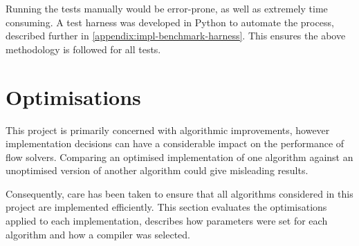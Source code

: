 Running the tests manually would be error-prone, as well as extremely time consuming. A test harness was developed in Python to automate the process, described further in \cref{appendix:impl-benchmark-harness}. This ensures the above methodology is followed for all tests.



\section{Optimisations} \label{sec:eval-optimisations}

This project is primarily concerned with algorithmic improvements, however implementation decisions can have a considerable impact on the performance of flow solvers. Comparing an optimised implementation of one algorithm against an unoptimised version of another algorithm could give misleading results. 

Consequently, care has been taken to ensure that all algorithms considered in this project are implemented efficiently. This section evaluates the optimisations applied to each implementation, describes how parameters were set for each algorithm and how a compiler was selected.

%
%
%
%
%
%
%
